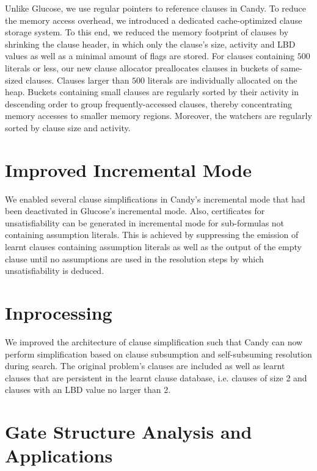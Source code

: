 \documentclass[conference]{IEEEtran}
\begin{document}
Unlike Glucose, we use regular pointers to reference clauses in Candy. To reduce the memory access overhead, we introduced a dedicated cache-optimized clause storage system.
To this end, we reduced the memory footprint of clauses by shrinking the clause header, in which only the clause's size, activity and LBD values as well as a minimal amount of flags are stored.
For clauses containing $500$ literals or less, our new clause allocator preallocates clauses in buckets of same-sized clauses.
Clauses larger than $500$ literals are individually allocated on the heap.
Buckets containing small clauses are regularly sorted by their activity in descending order to group frequently-accessed clauses, thereby concentrating memory accesses to smaller memory regions.
Moreover, the watchers are regularly sorted by clause size and activity.

\section{Improved Incremental Mode}

We enabled several clause simplifications in Candy's incremental mode that had been deactivated in Glucose's incremental mode.
Also, certificates for unsatisfiability can be generated in incremental mode for sub-formulas not containing assumption literals.
This is achieved by suppressing the emission of learnt clauses containing assumption literals as well as the output of the empty clause until no assumptions are used in the resolution steps by which unsatisfiability is deduced.

\section{Inprocessing}

We improved the architecture of clause simplification such that Candy can now perform simplification based on clause subsumption and self-subsuming resolution during search.
The original problem's clauses are included as well as learnt clauses that are persistent in the learnt clause database, i.e. clauses of size 2 and clauses with an LBD value no larger than 2.

\section{Gate Structure Analysis and Applications}
\end{document}
